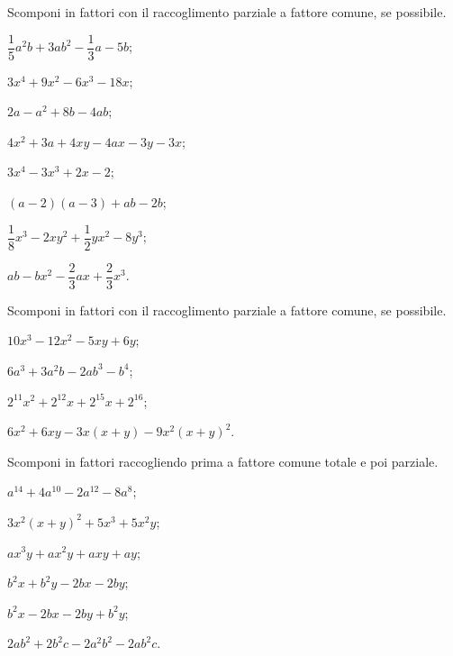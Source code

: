 \begin{esercizio}[\Ast]
\label{ese:13.18}
Scomponi in fattori con il raccoglimento parziale a fattore comune, se possibile.
\begin{multicols}{2}
\begin{enumeratea}
 \item $\dfrac{1}{5}a^{2}b+3ab^{2}-\dfrac{1}{3}a-5b$;
 \item $3x^{4}+9x^{2}-6x^{3}-18x$;
 \item $2a-a^{2}+8b-4ab$;
 \item $4x^{2}+3a+4xy-4ax-3y-3x$;
 \item $3x^{4}-3x^{3}+2x-2$;
 \item $(a-2)(a-3)+ab-2b$;
 \item $\dfrac{1}{8}x^{3}-2xy^{2}+\dfrac{1}{2}yx^{2}-8y^{3}$;
 \item $ab-bx^{2}-\dfrac{2}{3}ax+\dfrac{2}{3}x^{3}$.
\end{enumeratea}
\end{multicols}
\end{esercizio}

\begin{esercizio}[\Ast]
\label{ese:13.19}
Scomponi in fattori con il raccoglimento parziale a fattore comune, se possibile.
\begin{multicols}{2}
\begin{enumeratea}
 \item $10x^3-12x^2-5xy+6y$;
 \item $6a^3+3a^2b-2ab^3-b^4$;
 \item $2^{11}x^{2}+2^{12}x+2^{15}x+2^{16}$;
 \item $6x^{2}+6xy-3x(x+y)-9x^{2}(x+y)^{2}$.
\end{enumeratea}
\end{multicols}
\end{esercizio}

\begin{esercizio}[\Ast]
\label{ese:13.20}
Scomponi in fattori raccogliendo prima a fattore comune totale e poi parziale.
\begin{multicols}{2}
 \begin{enumeratea}
 \item $a^{14}+4a^{10}-2a^{12}-8a^{8}$;
 \item $3x^{2}(x+y)^{2}+5x^{3}+5x^{2}y$;
 \item $ax^{3}y+ax^{2}y+axy+ay$;
 \item $b^{2}x+b^{2}y-2bx-2by$;
 \item $b^{2}x-2bx-2by+b^{2}y$;
 \item $2ab^{2}+2b^{2}c-2a^{2}b^{2}-2ab^{2}c$.
\end{enumeratea}
\end{multicols}
\end{esercizio}

